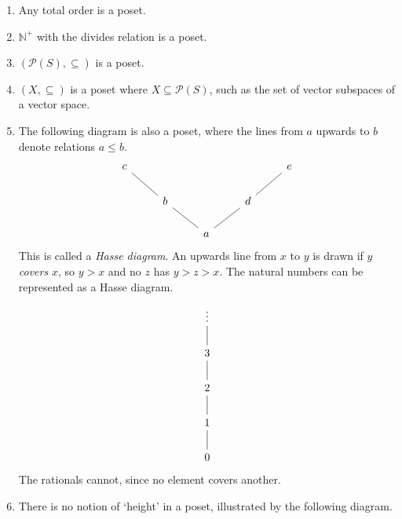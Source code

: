 \begin{example}
    \begin{enumerate}
        \item Any total order is a poset.
        \item \( \mathbb N^+ \) with the divides relation is a poset.
        \item \( (\mathcal P(S), \subseteq) \) is a poset.
        \item \( (X, \subseteq) \) is a poset where \( X \subseteq \mathcal P(S) \), such as the set of vector subspaces of a vector space.
\item The following diagram is also a poset, where the lines from \( a \) upwards to \( b \) denote relations \( a \leq b \).
\[\begin{tikzcd}
	c &&&& e \\
	& b && d \\
	&& a
	\arrow[no head, from=3-3, to=2-2]
	\arrow[no head, from=2-2, to=1-1]
	\arrow[no head, from=3-3, to=2-4]
	\arrow[no head, from=2-4, to=1-5]
\end{tikzcd}\]
This is called a \emph{Hasse diagram}.
An upwards line from \( x \) to \( y \) is drawn if \( y \) \emph{covers} \( x \), so \( y > x \) and no \( z \) has \( y > z > x \).
The natural numbers can be represented as a Hasse diagram.
\[\begin{tikzcd}
	\vdots \\
	3 \\
	2 \\
	1 \\
	0
	\arrow[no head, from=5-1, to=4-1]
	\arrow[no head, from=4-1, to=3-1]
	\arrow[no head, from=3-1, to=2-1]
	\arrow[no head, from=2-1, to=1-1]
\end{tikzcd}\]
The rationals cannot, since no element covers another.
\item There is no notion of `height' in a poset, illustrated by the following diagram.

\end{enumerate}
\end{example}
